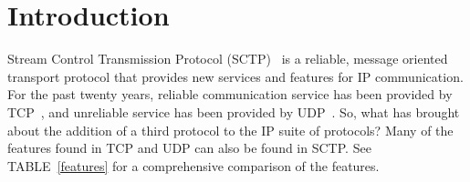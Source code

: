 \documentclass[conference]{IEEEtran}
\begin{document}




%



\section{Introduction}
Stream Control Transmission Protocol (SCTP)~\cite{rfc4960} is a reliable, message oriented
transport protocol that provides new services and features for IP communication.
For the past twenty years, reliable communication service has been provided by TCP~\cite{rfc793}, and unreliable service has been provided by UDP~\cite{rfc768}.
So, what has brought about the addition of a third protocol to the IP suite of protocols? Many of the features found in TCP and UDP can also be found in SCTP.
See TABLE~\ref{features} for a comprehensive comparison of the features. 
\end{document}
